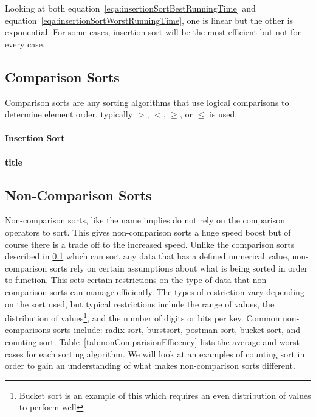 \documentclass[12pt]{article}
\begin{document}
	
	
	Looking at both equation~\ref{eqa:insertionSortBestRunningTime} and equation~\ref{eqa:insertionSortWorstRunningTime}, one is linear but the other is exponential.
	For some cases, insertion sort will be the most efficient but not for every case.
	
	\subsection{Comparison Sorts}
	\label{CompSort}
	Comparison sorts are any sorting algorithms that use logical comparisons to determine element order, typically $>$, $<$, $\ge$, or $\le$ is used.
	
	\paragraph{Insertion Sort}
	
	
	\paragraph{title}
	
	
	
	\subsection{Non-Comparison Sorts}
	
	Non-comparison sorts, like the name implies do not rely on the comparison operators to sort.
	This gives non-comparison sorts a huge speed boost but of course there is a trade off to the increased speed.
	Unlike the comparison sorts described in \ref{CompSort} which can sort any data that has a defined numerical value, non-comparison sorts rely on certain assumptions about what is being sorted in order to function.
	This sets certain restrictions on the type of data that non-comparison sorts can manage efficiently.
	The types of restriction vary depending on the sort used, but typical restrictions include the range of values, the distribution of values\footnote{Bucket sort is an example of this which requires an even distribution of values to perform well}, and the number of digits or bits per key.
	Common non-comparisons sorts include: radix sort, burstsort, postman sort, bucket sort, and counting sort.
	Table~\ref{tab:nonComparisionEfficency} lists the average and worst cases for each sorting algorithm.
	We will look at an examples of counting sort in order to gain an understanding of what makes non-comparison sorts different.
\end{document}
